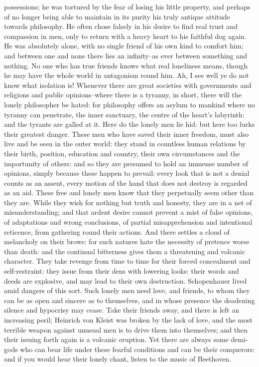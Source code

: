 possessions; he was tortured by the fear of losing his little
property, and perhaps of no longer being able to maintain in its
purity his truly antique attitude towards philosophy. He often chose
falsely in his desire to find real trust and compassion in men, only
to return with a heavy heart to his faithful dog again. He was
absolutely alone, with no single friend of his own kind to comfort
him; and between one and none there lies an infinity--as ever between
something and nothing. No one who has true friends knows what real
loneliness means, though he may have the whole world in antagonism
round him. Ah, I see well ye do not know what isolation is! Whenever
there are great societies with governments and religions and public
opinions--where there is a tyranny, in short, there will the lonely
philosopher be hated: for philosophy offers an asylum to mankind
where no tyranny can penetrate, the inner sanctuary, the centre of
the heart's labyrinth: and the tyrants are galled at it. Here do the
lonely men lie hid: but here too lurks their greatest danger. These
men who have saved their inner freedom, must also live and be seen in
the outer world: they stand in countless human relations by their
birth, position, education and country, their own circumstances and
the importunity of others: and so they are presumed to hold an
immense number of opinions, simply because these happen to prevail:
every look that is not a denial counts as an assent, every motion of
the hand that does not destroy is regarded as an aid. These free and
lonely men know that they perpetually seem other than they are. While
they wish for nothing but truth and honesty, they are in a net of
misunderstanding; and that ardent desire cannot prevent a mist of
false opinions, of adaptations and wrong conclusions, of partial
misapprehension and intentional reticence, from gathering round their
actions. And there settles a cloud of melancholy on their brows: for
such natures hate the necessity of pretence worse than death: and the
continual bitterness gives them a threatening and volcanic character.
They take revenge from time to time for their forced concealment and
self-restraint: they issue from their dens with lowering looks: their
words and deeds are explosive, and may lead to their own destruction.
Schopenhauer lived amid dangers of this sort. Such lonely men need
love, and friends, to whom they can be as open and sincere as to
themselves, and in whose presence the deadening silence and hypocrisy
may cease. Take their friends away, and there is left an increasing
peril; Heinrich von Kleist was broken by the lack of love, and the
most terrible weapon against unusual men is to drive them into
themselves; and then their issuing forth again is a volcanic
eruption. Yet there are always some demi-gods who can bear life under
these fearful conditions and can be their conquerors: and if you
would hear their lonely chant, listen to the music of Beethoven.

